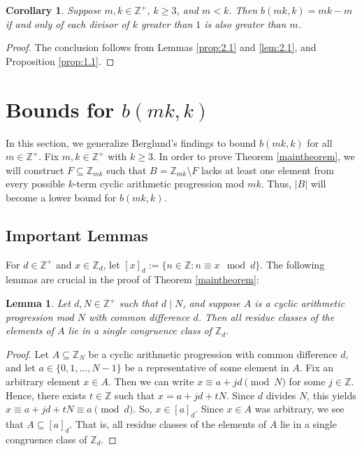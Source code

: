 \documentclass{article}
\newtheorem{lemma}[theorem]{Lemma}
\newtheorem{corollary}[theorem]{Corollary}
\theoremstyle{definition}
\theoremstyle{remark}
\begin{document}
 \begin{corollary}
    Suppose $m,k \in \mathbb{Z}^{+}$, $k \geq 3$, and $m < k$. Then $b(mk,k) = mk-m$ if and only of each divisor of $k$ greater than $1$ is also greater than $m$.
\end{corollary}

\begin{proof}
    The conclusion follows from Lemmas \ref{prop:2.1} and \ref{lem:2.1}, and Proposition \ref{prop:1.1}.
\end{proof}

\section{Bounds for $b(mk,k)$}\label{sec:3}

In this section, we generalize Berglund's findings to bound $b(mk,k)$ for all $m \in \mathbb{Z}^+$. Fix $m,k \in \mathbb{Z}^+$ with $k \geq 3$. In order to prove Theorem \ref{maintheorem}, we will construct $F \subseteq \mathbb{Z}_{mk}$ such that $B = \mathbb{Z}_{mk} \setminus F$ lacks at least one element from every possible $k$-term cyclic arithmetic progression mod $mk$. Thus, $|B|$ will become a lower bound for $b(mk,k)$. 

\subsection{Important Lemmas}
For $d \in \mathbb{Z}^{+}$ and $x \in \mathbb{Z}_d$, let $[x]_d := \{n \in \mathbb{Z} : n \equiv x \mod d\}$. The following lemmas are crucial in the proof of Theorem \ref{maintheorem}:
    
\begin{lemma}
\label{lem:3.1real}
    Let $d,N \in \mathbb{Z}^+$ such that $d \mid N$, and suppose $A$ is a cyclic arithmetic progression mod $N$ with common difference $d$. Then all residue classes of the elements of $A$ lie in a single congruence class of $\mathbb{Z}_{d}$.
\end{lemma}

\begin{proof}
    Let $A \subseteq \mathbb{Z}_{N}$ be a cyclic arithmetic progression with common difference $d$, and let $a \in \{0,1,\ldots,N-1\}$ be a representative of some element in $A$. Fix an arbitrary element $x \in A$. Then we can write $x \equiv a+jd \pmod N$ for some $j \in \mathbb{Z}$. Hence, there exists $t \in \mathbb{Z}$ such that $x = a+jd+tN$. Since $d$ divides $N$, this yields $x \equiv a+jd+tN \equiv a \pmod d$. So, $x \in [a]_d$. Since $x \in A$ was arbitrary, we see that $A \subseteq [a]_d$. That is, all residue classes of the elements of $A$ lie in a single congruence class of $\mathbb{Z}_{d}$.
\end{proof}
\end{document}
